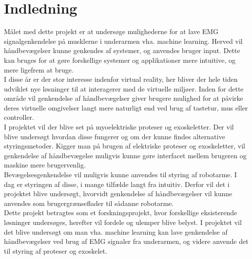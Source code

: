 \thispagestyle{fancy}
\chapter{Indledning}
\label{chp:indledning}
Målet med dette projekt er at undersøge mulighederne for at lave EMG signalgenkendelse på musklerne i underarmen vha. machine learning. Herved vil håndbevægelser kunne genkendes af systemer, og anvendes bruger input. Dette kan bruges for at gøre forskellige systemer og applikationer mere intuitive, og mere ligefrem at bruge.\\

I disse år er der stor interesse indenfor virtual reality, her bliver der hele tiden udviklet nye løsninger til at interagerer med de virtuelle miljøer. Inden for dette område vil genkendelse af håndbevægelser giver brugere mulighed for at påvirke deres virtuelle omgivelser langt mere naturligt end ved brug af tastetur, mus eller controller.\\

I projektet vil der blive set på myoelektriske proteser og exoskeletter. Der vil blive undersøgt hvordan disse fungerer og om der kunne findes alternative styringsmetoder.
Kigger man på brugen af elektriske proteser og exoskeletter, vil genkendelse af håndbevægelse muligvis kunne gøre interfacet mellem brugeren og maskine  mere brugervenlig.\\

Bevægelsesgenkendelse vil muligvis kunne anvendes til styring af robotarme. I dag er styringen af disse, i mange tilfælde langt fra intuitiv. Derfor vil det i projektet blive undersøgt, hvorvidt genkendelse af håndbevægelser vil kunne anvendes som brugergrænseflader til sådanne robotarme. \\

Dette projekt betragtes som et forskningsprojekt, hvor forskellige eksisterende løsninger undersøges, herefter vil fordele og ulemper blive belyst. I projektet vil det blive undersøgt om man vha. machine learning kan lave genkendelse af håndbevægelser ved brug af EMG signaler fra underarmen, og videre anvende det til styring af proteser og exoskelet.

%
%
%
%
